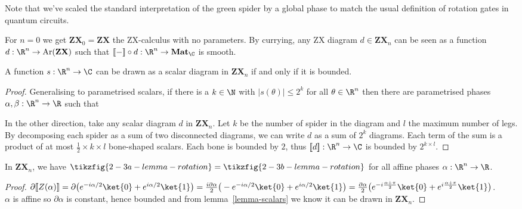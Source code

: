 \begin{remark}
Note that we've scaled the standard interpretation of the green spider by a global phase
to match the usual definition of rotation gates in quantum circuits.
\end{remark}

\begin{remark}
For $n = 0$ we get $\mathbf{ZX}_0 = \mathbf{ZX}$ the ZX-calculus
with no parameters.
By currying, any ZX diagram $d \in \mathbf{ZX}_n$ can be seen as a function
$d : \R^n \to \text{Ar}(\mathbf{ZX})$ such that
$[\![-]\!] \circ d : \R^n \to \mathbf{Mat}_\C$ is smooth.
\end{remark}

\begin{lemma}\label{lemma-scalars}
A function $s : \R^n \to \C$ can be drawn as a scalar diagram in
$\mathbf{ZX}_n$ if and only if it is bounded.
\end{lemma}

\begin{proof}
Generalising \cite[P.~8.101]{CoeckeKissinger17} to parametrised scalars,
if there is a $k \in \N$ with $\vert s(\theta) \vert \leq 2^k$ for all
$\theta \in \R^n$ then there are parametrised
phases $\alpha, \beta : \R^n \to \R$ such that


In the other direction, take any scalar diagram $d$ in $\mathbf{ZX}_n$.
Let $k$ be the number of spider in the diagram and $l$ the maximum number
of legs. By decomposing each spider as a sum of two disconnected diagrams,
we can write $d$ as a sum of $2^k$ diagrams. Each term of the sum is a product
of at most $\frac{1}{2} \times k \times l$ bone-shaped scalars. Each bone is
bounded by $2$, thus $[\![d]\!] : \R^n \to \C$ is bounded by $2^{k \times l}$.
\end{proof}

\begin{lemma}\label{lemma-rotations}
In $\mathbf{ZX}_n$, we have
$ \tikzfig{2-3a-lemma-rotation} = \tikzfig{2-3b-lemma-rotation} $
for all affine phases $\alpha : \R^n \to \R$.
\end{lemma}

\begin{proof}
$\partial [\![ Z(\alpha) ]\!]
= \partial \big( e^{-i \alpha / 2} \ket{0}+ e^{i \alpha / 2} \ket{1}\big)
= \frac{i\partial\alpha}{2}\big(-e^{-i \alpha / 2} \ket{0}
+ e^{i\alpha / 2} \ket{1}\big)
= \frac{\partial\alpha}{2}\big(e^{-i\frac{\alpha+\pi}{2}} \ket{0}
+ e^{i\frac{\alpha+\pi}{2}} \ket{1}\big)$.\\
$\alpha$ is affine so $\partial \alpha$ is constant, hence
bounded and from lemma~\ref{lemma-scalars} we know it can be drawn
in $\mathbf{ZX}_n$.
\end{proof}

